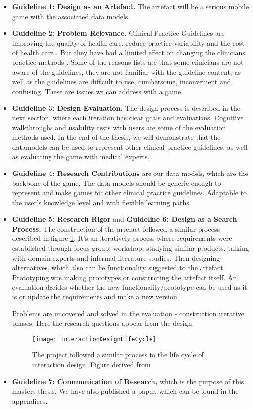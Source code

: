 \begin{itemize}
	\item \textbf{Guideline 1: Design as an Artefact.} The artefact will be a serious mobile game with the associated data models.
	\item \textbf{Guideline 2: Problem Relevance.} Clinical Practice Guidelines are improving the quality of health care, reduce practice variability and the cost of health care \parencite{DeClercq2008}. But they have had a limited effect on changing the clinicians practice methods \parencite{Cabana1999}. Some of the reasons \textcite{Cabana1999} lists are that some clinicians are not aware of the guidelines, they are not familiar with the guideline content, as well as the guidelines are difficult to use, cumbersome, inconvenient and confusing. These are issues we can address with a game.
	\item \textbf{Guideline 3: Design Evaluation.} The design process is described in the next section, where each iteration has clear goals and evaluations. Cognitive walkthroughs and usability tests with users are some of the evaluation methods used. In the end of the thesis, we will demonstrate that the datamodels can be used to represent other clinical practice guidelines, as well as evaluating the game with medical experts.
	\item \textbf{Guideline 4: Research Contributions} are our data models, which are the backbone of the game. The data models should be generic enough to represent and make games for other clinical practice guidelines. Adaptable to the user's knowledge level and with flexible learning paths.
	\item \textbf{Guideline 5: Research Rigor} and \textbf{Guideline 6: Design as a Search Process.} The construction of the artefact followed a similar process described in figure \ref{fig:InteractionDesignLifeCycle}. It's an iteratively process where requirements were established through focus group, workshop, studying similar products, talking with domain experts and informal literature studies. Then designing alternatives, which also can be functionality suggested to the artefact. Prototyping was making prototypes or constructing the artefact itself. An evaluation decides whether the new functionality/prototype can be used as it is or update the requirements and make a new version.
	
	Problems are uncovered and solved in the evaluation - construction iterative phases. Here the research questions appear from the design. 
	
		\begin{figure}[h!]
		\label{fig:InteractionDesignLifeCycle}
		\texttt{[image: InteractionDesignLifeCycle]}
		\caption {The project followed a similar process to the life cycle of interaction design. Figure derived from \textcite{Preece2015}}
	\end{figure}
	\item \textbf{Guideline 7: Communication of Research,} which is the purpose of this masters thesis. We have also published a paper, which can be found in the appendices.
\end{itemize}


